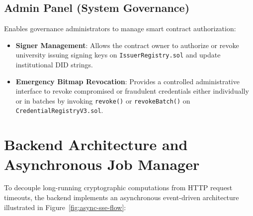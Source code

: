 \subsection{Admin Panel (System Governance)}
Enables governance administrators to manage smart contract authorization:
\begin{itemize}
    \item \textbf{Signer Management}: Allows the contract owner to authorize or revoke university issuing signing keys on \texttt{IssuerRegistry.sol} and update institutional DID strings.
    \item \textbf{Emergency Bitmap Revocation}: Provides a controlled administrative interface to revoke compromised or fraudulent credentials either individually or in batches by invoking \texttt{revoke()} or \texttt{revokeBatch()} on \texttt{CredentialRegistryV3.sol}.
\end{itemize}

\section{Backend Architecture and Asynchronous Job Manager}

To decouple long-running cryptographic computations from HTTP request timeouts, the backend implements an asynchronous event-driven architecture illustrated in Figure~\ref{fig:async-sse-flow}:

